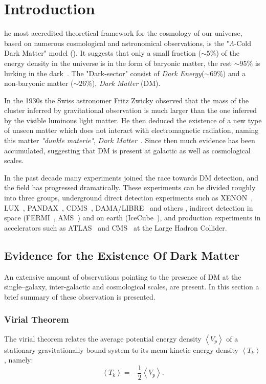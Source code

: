 %
%
\let\textcircled=\pgftextcircled
\chapter{Introduction}
\label{chap:intro}

he most accredited theoretical framework for the cosmology of our universe, based on numerous cosmological and astronomical observations, is the "$\Lambda$-Cold Dark Matter" model (\cdm). It suggests that only a small fraction ($\sim 5\%$) of the energy density in the universe is in the form of baryonic matter, the rest  $\sim 95\%$ is lurking in the dark~\cite{WMAP:9years, Planck}. The "Dark-sector" consist of \textit{Dark Energy}($\sim 69\%$) and a non-baryonic matter ($\sim 26\%$), \textit{Dark Matter} (DM).

In the 1930s the Swiss astronomer Fritz Zwicky observed that the mass of the cluster inferred by gravitational observation is much larger than the one inferred by the visible luminous light matter. He then deduced the existence of a new type of unseen matter which does not interact with electromagnetic radiation, naming this matter \textit{"dunkle materie"}, \textit{Dark Matter}~\cite{Zwicky:1937zza}. Since then much evidence has been accumulated, suggesting that DM is present at galactic as well as cosmological scales.

In the past decade many experiments joined the race towards DM detection, and the field has progressed dramatically. These experiments can be divided
roughly into three groups, underground direct detection experiments such as XENON~\cite{xe100_run_combination,Xenon1TResults}, LUX~\cite{LUXnew}, PANDAX~\cite{PANDAX}, CDMS~\cite{CDMSlite}, DAMA/LIBRE~\cite{DAMA} and others , indirect detection in space (FERMI~\cite{FermiLAT:2011ab}, AMS~\cite{AMS}) and on earth (IceCube~\cite{IceCube}), and production experiments in accelerators such as ATLAS~\cite{AtlasDM} and CMS~\cite{CmsDM} at the Large Hadron Collider.
\section{Evidence for the Existence Of Dark Matter}
\label{sec:Evidence}
An extensive amount of observations pointing to the presence of DM at the  single--galaxy, inter-galactic and cosmological scales, are present. In this section a brief summary of these observation is presented. 

\subsection{Virial Theorem}
\label{subsec:virial}
The virial theorem relates the average potential energy density $\left\langle V_p \right\rangle$ of a stationary gravitationally bound system to its mean kinetic energy density $\left\langle T_k \right\rangle $, namely:
\begin{equation}
\left\langle T_k \right\rangle  =-\frac{1}{2}\left\langle V_p \right\rangle.
\end{equation}


